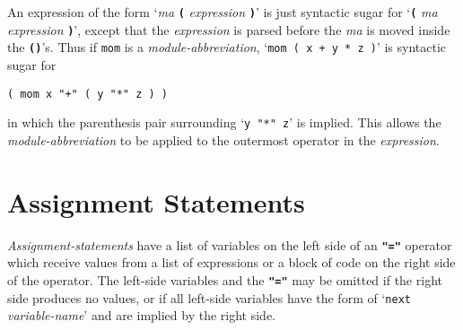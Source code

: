 \documentclass[12pt]{article}
\newcommand{\TT}[1]{{\tt \bfseries #1}}
\begin{document}
An expression of the form `{\em ma} \TT{(} {\em expression} \TT{)}' is%
\label{MA-SYNTACTIC-SUGAR}
just syntactic sugar for `\TT{(} {\em ma} {\em expression} \TT{)}', except
that the {\em expression} is parsed before the {\em ma} is moved inside the
\TT{()}'s.  Thus if {\tt mom} is a {\em module-abbreviation},
`{\tt mom ( x + y * z )}' is syntactic sugar for \\
\centerline{\tt ( mom x "+" ( y "*" z ) )}
in which the parenthesis pair surrounding `{\tt y "*" z}' is implied.
This allows the {\em module-abbre\-via\-tion} to be applied to the outermost
operator in the {\em expression}.

\section{Assignment Statements}
\label{ASSIGNMENT-STATEMENTS}

{\em Assignment-statements} have a list of variables on the
left side of an \TT{"="} operator
which receive values from a list of expressions or
a block of code on the right side of the operator.  The left-side variables
and the \TT{"="}
may be omitted if the right side produces no values,
or if all left-side variables
have the form of `{\tt next} {\em variable-name}' and are
implied by the right side.
\end{document}
